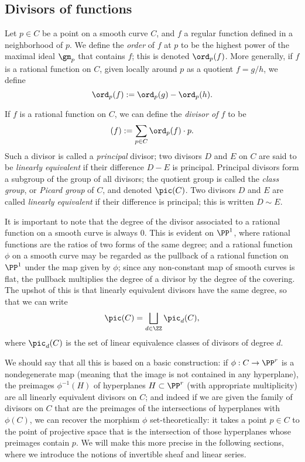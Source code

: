\subsection{Divisors of functions}

Let $p \in C$ be a point on a smooth curve $C$, and $f$ a regular function defined in a neighborhood of $p$. We define the \emph{order} of $f$ at $p$ to be the highest power of the maximal ideal $\gm_p$ that contains $f$; this is denoted $\ord_p(f)$. More generally, if $f$ is a rational function on $C$, given locally around $p$ as a quotient $f = g/h$, we define 
$$
\ord_p(f) := \ord_p(g) - \ord_p(h).
$$

If $f$ is a rational function on $C$, we can define the \emph{divisor of $f$} to be
$$
(f) := \sum_{p \in C} \ord_p(f) \cdot p.
$$
Such a divisor is called a \emph{principal} divisor; two divisors $D$ and $E$ on $C$ are said to be \emph{linearly equivalent} if their difference $D-E$ is principal. Principal divisors form a subgroup of the group of all divisors; the quotient group is called the \emph{class group}, or \emph{Picard group} of $C$, and denoted $\pic(C)$. Two divisors $D$ and $E$ are called \emph{linearly equivalent} if their difference is principal; this is written $D \sim E$.

It is important to note that the degree of the divisor associated to a rational function on a smooth curve is always 0. This is evident on $\PP^1$, where rational 
functions are the ratios of two forms of the same degree; and a rational function $\phi$ on a smooth curve may be regarded as the pullback of a rational function
on $\PP^1$ under the map given by $\phi$; since any non-constant map of smooth curves is flat, the pullback multiplies the degree of a divisor by the degree 
of the covering. The upshot of this is that linearly equivalent divisors have the same degree, so that we can write
$$
\pic(C) = \bigsqcup_{d \in \ZZ} \pic_d(C),
$$
where $\pic_d(C)$ is the set of linear equivalence classes of divisors of degree $d$.

We should say that all this is based on a basic construction: if $\phi : C \to \PP^r$ is a nondegenerate map (meaning that the image is not contained in any hyperplane), the preimages $\phi^{-1}(H)$ of hyperplanes $H \subset \PP^r$ (with appropriate multiplicity) are all linearly equivalent divisors on $C$; and indeed if we are given the family of divisors on $C$ that are the preimages of the intersections of hyperplanes with  $\phi(C)$, we can recover the morphism $\phi$ set-theoretically: it takes a point $p\in C$ to the point of projective space that is the intersection of those
hyperplanes whose preimages contain $p$. We will make this more precise in the following sections, where we introduce the notions of invertible sheaf and linear series.


